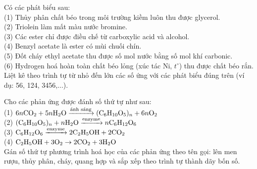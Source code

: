 \documentclass[11pt,a4paper]{article}
\begin{document}
\begin{ex}
Có các phát biểu sau:\\
(1) Thủy phân chất béo trong môi trường kiềm luôn thu được glycerol.\\
(2) Triolein làm mất màu nước bromine.\\
(3) Các ester chỉ được điều chế từ carboxylic acid và alcohol.\\
(4) Benzyl acetate là ester có mùi chuối chín.\\
(5) Đốt cháy ethyl acetate thu được số mol nước bằng số mol khí carbonic.\\
(6) Hydrogen hoá hoàn toàn chất béo lỏng (xúc tác Ni, $t^\circ$) thu được chất béo rắn.\\
Liệt kê theo trình tự từ nhỏ đến lớn các số ứng với các phát biểu đúng trên (ví dụ: 56, 124, 3456,...).

\end{ex}
\begin{ex}
Cho các phản ứng được đánh số thứ tự như sau:\\
(1) $6n\ce{CO2} + 5n\ce{H2O} \xrightarrow{\text{ánh sáng}} (\ce{C6H10O5})_n + 6n\ce{O2}$\\
(2) $(\ce{C6H10O5})_n + n\ce{H2O} \xrightarrow{\text{enzyme}} n\ce{C6H12O6}$\\
(3) $\ce{C6H12O6} \xrightarrow{\text{enzyme}} 2\ce{C2H5OH} + 2\ce{CO2}$\\
(4) $\ce{C2H5OH} + 3\ce{O2} \rightarrow 2\ce{CO2} + 3\ce{H2O}$\\
Gán số thứ tự phương trình hoá học của các phản ứng theo tên gọi: lên men rượu, thủy phân, cháy, quang hợp và sắp xếp theo trình tự thành dãy bốn số.

\end{ex}
\end{document}
